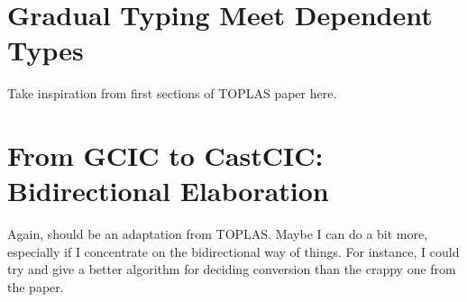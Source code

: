 \documentclass[
  french,english,
	fontsize=10pt, %
	twoside=true, %
	open=any, %
	secnumdepth=1, %
  numbers=noenddot,
]{kaobook/kaobook}
\begin{document}



\mainmatter %









\label{part:bidir}






\label{part:metacoq}





\label{part:gradual}

\chapter{Gradual Typing Meet Dependent Types}
\label{chap:gradual-dependent}

Take inspiration from first sections of TOPLAS paper here.

\chapter{From GCIC to CastCIC: Bidirectional Elaboration}
\label{chap:bidir-gradual-elab}

Again, should be an adaptation from TOPLAS. Maybe I can do a bit more, especially if
I concentrate on the bidirectional way of things. For instance, I could try and give a better algorithm for deciding conversion than the crappy one from the paper.

\end{document}
